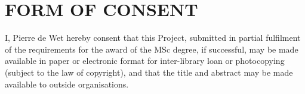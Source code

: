 \chapter*{FORM OF CONSENT}

I, Pierre de Wet hereby consent that this Project, submitted in partial fulfilment of the requirements for the award of the MSc degree, if successful, may be made available in paper or electronic format for inter-library loan or photocopying (subject to the law of copyright), and that the title and abstract may be made available to outside organisations.
\vfill
\noindent {} \hfill